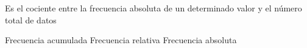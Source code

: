 
\question Es el cociente entre la frecuencia absoluta de un determinado
valor y el número total de datos

  \begin{oneparchoices}
    \choice Frecuencia acumulada
    \CorrectChoice Frecuencia relativa
    \choice Frecuencia absoluta
  \end{oneparchoices}
